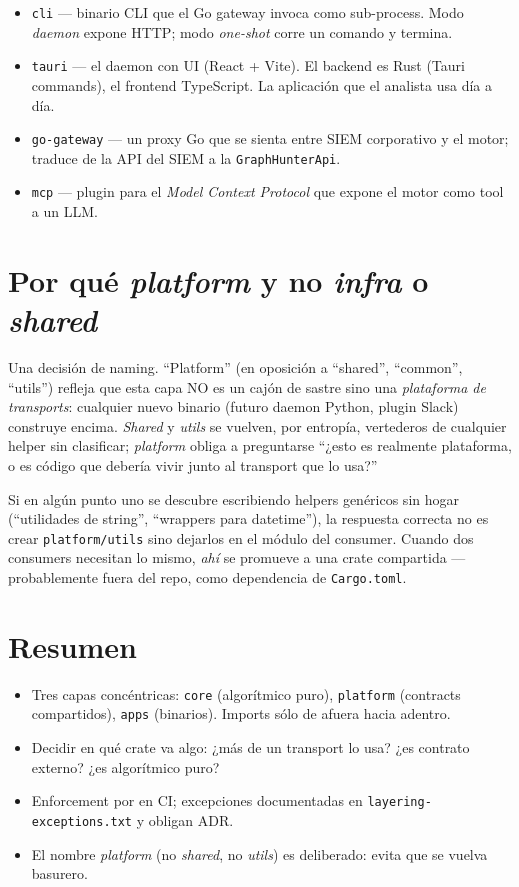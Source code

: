 \begin{itemize}
    \item \texttt{cli} — binario CLI que el Go gateway invoca como
    sub-process. Modo \emph{daemon} expone HTTP; modo \emph{one-shot}
    corre un comando y termina.
    \item \texttt{tauri} — el daemon con UI (React + Vite). El
    backend es Rust (Tauri commands), el frontend TypeScript. La
    aplicación que el analista usa día a día.
    \item \texttt{go-gateway} — un proxy Go que se sienta entre
    SIEM corporativo y el motor; traduce de la API del SIEM a la
    \texttt{GraphHunterApi}.
    \item \texttt{mcp} — plugin para el \emph{Model Context Protocol}
    que expone el motor como tool a un LLM.
\end{itemize}

\section{Por qué \emph{platform} y no \emph{infra} o \emph{shared}}

Una decisión de naming. ``Platform'' (en oposición a ``shared'',
``common'', ``utils'') refleja que esta capa NO es un cajón de
sastre sino una \emph{plataforma de transports}: cualquier nuevo
binario (futuro daemon Python, plugin Slack) construye encima.
\emph{Shared} y \emph{utils} se vuelven, por entropía, vertederos
de cualquier helper sin clasificar; \emph{platform} obliga a
preguntarse ``¿esto es realmente plataforma, o es código que
debería vivir junto al transport que lo usa?''

\begin{nota}
Si en algún punto uno se descubre escribiendo helpers genéricos sin
hogar (``utilidades de string'', ``wrappers para datetime''), la
respuesta correcta no es crear \texttt{platform/utils} sino dejarlos
en el módulo del consumer. Cuando dos consumers necesitan lo mismo,
\emph{ahí} se promueve a una crate compartida ---probablemente
fuera del repo, como dependencia de \texttt{Cargo.toml}.
\end{nota}

\section{Resumen}

\begin{itemize}
    \item Tres capas concéntricas: \texttt{core} (algorítmico puro),
    \texttt{platform} (contracts compartidos), \texttt{apps}
    (binarios). Imports sólo de afuera hacia adentro.
    \item Decidir en qué crate va algo: ¿más de un transport lo usa?
    ¿es contrato externo? ¿es algorítmico puro?
    \item Enforcement por  en CI;
    excepciones documentadas en \texttt{layering-exceptions.txt} y
    obligan ADR.
    \item El nombre \emph{platform} (no \emph{shared}, no
    \emph{utils}) es deliberado: evita que se vuelva basurero.
\end{itemize}

